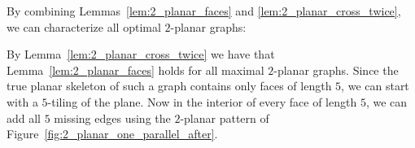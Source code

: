 %

By combining Lemmas~\ref{lem:2_planar_faces} and \ref{lem:2_planar_cross_twice}, we can characterize all optimal $2$-planar graphs:


 By Lemma~\ref{lem:2_planar_cross_twice} we have that Lemma~\ref{lem:2_planar_faces} holds for all maximal $2$-planar graphs. Since the true planar skeleton of such a graph contains only faces of length $5$, we can start with a $5$-tiling of the plane. Now in the interior of every face of length $5$, we can add all  $5$ missing edges using the $2$-planar pattern of Figure~\ref{fig:2_planar_one_parallel_after}.


